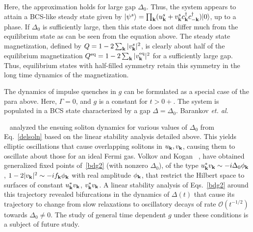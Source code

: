 \documentclass[aps,pra,floats,epsfig,pdflatex]{revtex4}                                                              %
\begin{document}
 {Here, the approximation holds for large gap $\Delta_0$. Thus, the system appears to attain a BCS-like steady state given by $|\psi^s\rangle = \prod_{\bf k} (u^s_{\bf k} + v^s_{\bf k} c_{\bf k}^{\dagger} c_{{\bf -k}}^{\dagger}) |0\rangle$, up to a phase. If $\Delta_0$ is sufficiently large, then this state does not differ much from the equilibrium state as can be seen from the equation above. The steady state magnetization, defined by $Q=1-2\sum_{\bf k}|v^{s}_{\bf k}|^2$, is clearly about half of the equilibrium magnetization $Q^{\rm eq}=1-2\sum_{\bf k}|v^{\rm eq}_{\bf k}|^2$ for a sufficiently large gap. Thus, equilibrium states with half-filled symmetry retain this symmetry in the long time dynamics of the magnetization.

The dynamics of impulse quenches in $g$ can be formulated as a special case of the para above. Here, $\Gamma=0$, and $g$ is a constant for $t>0+$. The system is populated in a BCS state characterized by a gap $\Delta=\Delta_0$. Barankov \textit{et. al.}}~\cite{barankov} { analyzed the ensuing soliton dynamics for various values of $\Delta_0$ from Eq.}~\ref{delsoln} { based on the linear stability analysis detailed above. This yields elliptic oscillations that cause overlapping solitons in $u_{\bf k},v_{\bf k}$, causing them to oscillate about those for an ideal Fermi gas. Volkov and Kogan}~\cite{volkov} {, have obtained generalized fixed points of}~\ref{bdg2} { (with nonzero $\Delta_0$), of the type $u^\ast_{\bf k}v_{\bf k}\sim -i\Delta_0 \phi_{\bf k}$, $1-2|v_{\bf k}|^2\sim -if_{\bf k}\phi_{\bf k}$ with real amplitude $\phi_{\bf k}$, that restrict the Hilbert space to surfaces of constant $u^\ast_{\bf k}v_{\bf k}$, $v^\ast_{\bf k}v_{\bf k}$. A linear stability analysis of Eqs.}~\ref{bdg2}  {around 
this 
trajectory revealed bifurcations in the dynamics of $\Delta(t)$ that cause its trajectory to change from slow relaxations to oscillatory decays of rate  $\mathcal{O}(t^{-1/2})$ towards $\Delta_0\neq 0$. The study of general time dependent $g$ under these conditions is a subject of future study.}
\end{document}

